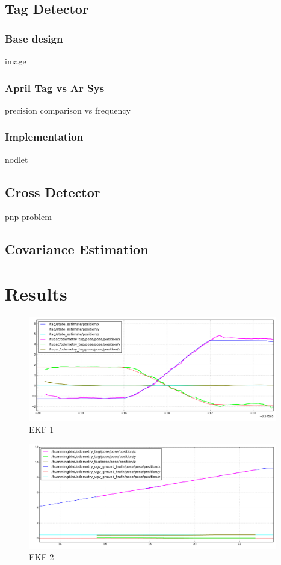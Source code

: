 \subsection{Tag Detector}
\subsubsection{Base design}
image

\subsubsection{April Tag vs Ar Sys}
precision comparison vs frequency
\subsubsection{Implementation}
nodlet
\subsection{Cross Detector}
pnp problem
\subsection{Covariance Estimation}



\section{Results}
\begin{figure}[!ht]
    \centering
    \includegraphics[width=0.97\textwidth]{img/position_real_world_fast.png}
    \caption{EKF 1}
    \label{fig:ekf_position_fast}
\end{figure}
\begin{figure}[!ht]
    \centering
    \includegraphics[width=0.97\textwidth]{img/position_simulation_hot_init.png}
    \caption{EKF 2}
    \label{fig:ekf_position_hot_init}
\end{figure}
